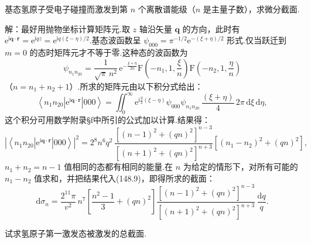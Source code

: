 \quad 基态氢原子受电子碰撞而激发到第 $n$ 个离散谱能级（$n$ 是主量子数），求微分截面.

解：最好用抛物坐标计算矩阵元.取 $z$ 轴沿矢量 $\boldsymbol{q}$ 的方向，此时有
$\mathrm{e}^{\mathrm{i}\boldsymbol{q}\cdot\boldsymbol{r}}=\mathrm{e}^{\mathrm{i}qz}
=\mathrm{e}^{\mathrm{i}q(\xi-\eta)/2}$.基态波函数呈
$\psi_{000}=\pi^{-1/2}\mathrm{e}^{-(\xi+\eta)/2}$ 形式.仅当跃迁到 $m=0$ 的态时矩阵元才不等于零.这种态的波函数为
\begin{equation*}
  \psi_{n_1n_20}=\frac{1}{\sqrt{\pi}\,n^2}\,
  \mathrm{e}^{-\frac{\xi+\eta}{2n}}
  \mathrm{F}\left(-n_1,1,\frac{\xi}{n}\right)
  \mathrm{F}\left(-n_2,1,\frac{\eta}{n}\right)
\end{equation*}
（$n=n_1+n_2+1$）.所求的矩阵元由以下积分式给出：
\begin{equation*}
  \left\langle n_1n_20\left|\mathrm{e}^{\mathrm{i}\boldsymbol{q}\cdot\boldsymbol{r}}\right|000\right\rangle
  =\iint_0^{\infty}\mathrm{e}^{\mathrm{i}\frac{q}{2}(\xi-\eta)}
  \psi_{000}\psi_{n_1n_20}\,\frac{(\xi+\eta)}{4}\,2\pi\,\mathrm{d}\xi\,\mathrm{d}\eta,
\end{equation*}
这个积分可用数学附录§f中所引的公式加以计算.结果得：
\begin{equation*}
  \left|\left\langle n_1n_20\left|\mathrm{e}^{\mathrm{i}\boldsymbol{q}\cdot\boldsymbol{r}}\right|000\right\rangle\right|^2
  =2^8n^6q^2\,\frac{\left[(n-1)^2+(qn)^2\right]^{n-3}}{\left[(n+1)^2+(qn)^2\right]^{n+3}}
  \left[(n_1-n_2)^2+(qn)^2\right],
\end{equation*}
$n_1+n_2=n-1$ 值相同的态都有相同的能量.在 $n$ 为给定的情形下，对所有可能的 $n_1-n_2$ 值求和，并把结果代入(148.9)，即得所求的截面：
\begin{equation*}
  \mathrm{d}\sigma_n=\frac{2^{11}\pi}{v^2}\,n^7
  \left[\frac{n^2-1}{3}+(qn)^2\right]
  \frac{\left[(n-1)^2+(qn)^2\right]^{n-3}}{\left[(n+1)^2+(qn)^2\right]^{n+3}}\,
  \frac{\mathrm{d}q}{q}.
\end{equation*}

\quad 试求氢原子第一激发态被激发的总截面.

